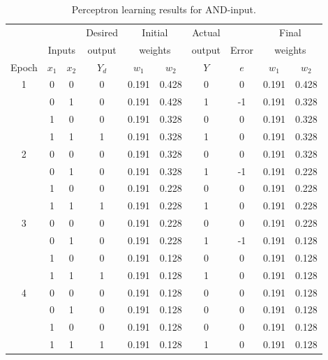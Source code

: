 \begin{table}
\centering
\begin{tabular}{cccccccccc}
\toprule
& & & Desired  & \multicolumn{2}{c}{Initial} & Actual & & \multicolumn{2}{c}{Final} \\
& \multicolumn{2}{c}{Inputs} & output & \multicolumn{2}{c}{weights} & output & Error & \multicolumn{2}{c}{weights} \\
Epoch & $x_1$ & $x_2$ & $Y_d$ & $w_1$ & $w_2$ & $Y$ & $e$ & $w_1$ & $w_2$ \\
\midrule
1 & 0 & 0 & 0 & 0.191 & 0.428 & 0 & 0 & 0.191 & 0.428 \\
  & 0 & 1 & 0 & 0.191 & 0.428 & 1 & -1 & 0.191 & 0.328 \\
  & 1 & 0 & 0 & 0.191 & 0.328 & 0 & 0 & 0.191 & 0.328 \\
  & 1 & 1 & 1 & 0.191 & 0.328 & 1 & 0 & 0.191 & 0.328 \\
2 & 0 & 0 & 0 & 0.191 & 0.328 & 0 & 0 & 0.191 & 0.328 \\
  & 0 & 1 & 0 & 0.191 & 0.328 & 1 & -1 & 0.191 & 0.228 \\
  & 1 & 0 & 0 & 0.191 & 0.228 & 0 & 0 & 0.191 & 0.228 \\
  & 1 & 1 & 1 & 0.191 & 0.228 & 1 & 0 & 0.191 & 0.228 \\
3 & 0 & 0 & 0 & 0.191 & 0.228 & 0 & 0 & 0.191 & 0.228 \\
  & 0 & 1 & 0 & 0.191 & 0.228 & 1 & -1 & 0.191 & 0.128 \\
  & 1 & 0 & 0 & 0.191 & 0.128 & 0 & 0 & 0.191 & 0.128 \\
  & 1 & 1 & 1 & 0.191 & 0.128 & 1 & 0 & 0.191 & 0.128 \\
4 & 0 & 0 & 0 & 0.191 & 0.128 & 0 & 0 & 0.191 & 0.128 \\
  & 0 & 1 & 0 & 0.191 & 0.128 & 0 & 0 & 0.191 & 0.128 \\
  & 1 & 0 & 0 & 0.191 & 0.128 & 0 & 0 & 0.191 & 0.128 \\
  & 1 & 1 & 1 & 0.191 & 0.128 & 1 & 0 & 0.191 & 0.128 \\
\bottomrule
\end{tabular}
\caption{Perceptron learning results for \textsc{AND}-input.}
\label{table:and}
\end{table}

